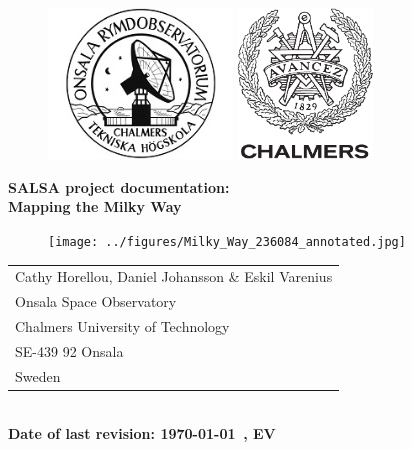 \begin{titlepage}

\begin{figure}[t]
\vspace{-2cm}
\centering
\includegraphics[height=4cm]{../figures/OSO-logo.jpg}
\hspace{4cm}
\includegraphics[height=4cm]{../figures/CHALMERS-logo.pdf}
\vspace{1cm}
\end{figure}

\begin{center}
\Huge \textbf{
SALSA project documentation: 		\\
\bigskip
Mapping the Milky Way
}
\end{center}

\begin{figure}[!h]
\centering
\texttt{[image: ../figures/Milky\_Way\_236084\_annotated.jpg]}
\end{figure}


\begin{center}
\begin{tabular}{l}
Cathy Horellou, Daniel Johansson \& Eskil Varenius\\
Onsala Space Observatory		\\
Chalmers University of Technology	\\
SE-439 92 Onsala			\\
Sweden					\\
\end{tabular}\\
\vspace{0.5cm}
\yyyymmdddate
{\bf Date of last revision: \today \, \currenttime, EV}
\end{center}

\end{titlepage}

